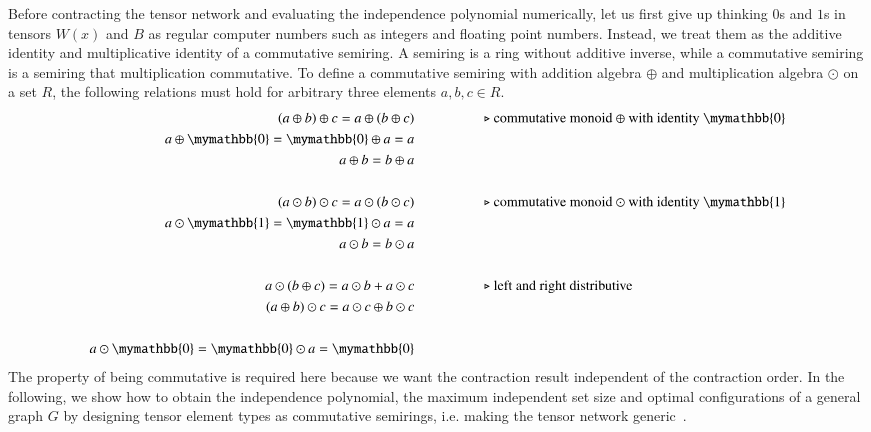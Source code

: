 \documentclass[review,onefignum,onetabnum]{siamart190516}
\newcommand{\<}{\langle}
\renewcommand{\>}{\rangle}
\begin{document}
Before contracting the tensor network and evaluating the independence polynomial numerically, let us first give up thinking $0$s and $1$s in tensors $W(x)$ and $B$ as regular computer numbers such as integers and floating point numbers.
Instead, we treat them as the additive identity and multiplicative identity of a commutative semiring.
A semiring is a ring without additive inverse, while a commutative semiring is a semiring that multiplication commutative.
To define a commutative semiring with addition algebra $\oplus$ and multiplication algebra $\odot$ on a set $R$, the following relations must hold for arbitrary three elements $a, b, c \in R$.
\begin{align*}
(a \oplus b) \oplus c = a \oplus (b \oplus c) & \hspace{5em}\text{$\triangleright$ commutative monoid $\oplus$ with identity $\mymathbb{0}$}\\
a \oplus \mymathbb{0} = \mymathbb{0} \oplus a = a &\\
a \oplus b = b \oplus a &\\
&\\
(a \odot b) \odot c = a \odot (b \odot c)  &   \hspace{5em}\text{$\triangleright$ commutative monoid $\odot$ with identity $\mymathbb{1}$}\\
a \odot  \mymathbb{1} =  \mymathbb{1} \odot a = a &\\
a \odot b = b \odot a &\\
&\\
a \odot (b\oplus c) = a\odot b + a\odot c  &  \hspace{5em}\text{$\triangleright$ left and right distributive}\\
(a\oplus b) \odot c = a\odot c \oplus b\odot c &\\
&\\
a \odot \mymathbb{0} = \mymathbb{0} \odot a = \mymathbb{0}
\end{align*}
The property of being commutative is required here because we want the contraction result independent of the contraction order.
In the following, we show how to obtain the independence polynomial, the maximum independent set size and optimal configurations of a general graph $G$ by designing tensor element types as commutative semirings,
i.e. making the tensor network generic~\cite{Stepanov2014}.
\end{document}
